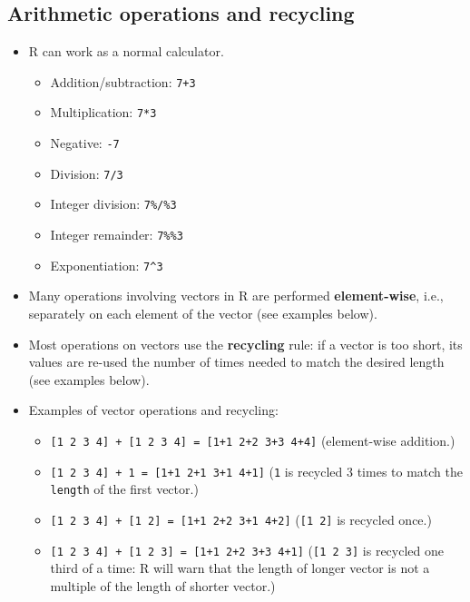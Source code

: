 \documentclass[
]{book}
\providecommand{\tightlist}{%
  \setlength{\itemsep}{0pt}\setlength{\parskip}{0pt}}
\begin{document}
\hypertarget{arithmetic-operations-and-recycling}{%
\subsection{Arithmetic operations and recycling}\label{arithmetic-operations-and-recycling}}

\begin{itemize}
\tightlist
\item
  R can work as a normal calculator.

  \begin{itemize}
  \tightlist
  \item
    Addition/subtraction: \texttt{7+3}
  \item
    Multiplication: \texttt{7*3}
  \item
    Negative: \texttt{-7}
  \item
    Division: \texttt{7/3}
  \item
    Integer division: \texttt{7\%/\%3}
  \item
    Integer remainder: \texttt{7\%\%3}
  \item
    Exponentiation: \texttt{7\^{}3}
  \end{itemize}
\item
  Many operations involving vectors in R are performed \textbf{element-wise}, i.e., separately on each element of the vector (see examples below).
\item
  Most operations on vectors use the \textbf{recycling} rule: if a vector is too short, its values are re-used the number of times needed to match the desired length (see examples below).
\item
  Examples of vector operations and recycling:

  \begin{itemize}
  \tightlist
  \item
    \texttt{{[}1\ 2\ 3\ 4{]}\ +\ {[}1\ 2\ 3\ 4{]}\ =\ {[}1+1\ 2+2\ 3+3\ 4+4{]}} (element-wise addition.)
  \item
    \texttt{{[}1\ 2\ 3\ 4{]}\ +\ 1\ =\ {[}1+1\ 2+1\ 3+1\ 4+1{]}} (\texttt{1} is recycled 3 times to match the \texttt{length} of the first vector.)
  \item
    \texttt{{[}1\ 2\ 3\ 4{]}\ +\ {[}1\ 2{]}\ =\ {[}1+1\ 2+2\ 3+1\ 4+2{]}} (\texttt{{[}1\ 2{]}} is recycled once.)
  \item
    \texttt{{[}1\ 2\ 3\ 4{]}\ +\ {[}1\ 2\ 3{]}\ =\ {[}1+1\ 2+2\ 3+3\ 4+1{]}} (\texttt{{[}1\ 2\ 3{]}} is recycled one third of a time: R will warn that the length of longer vector is not a multiple of the length of shorter vector.)
  \end{itemize}
\end{itemize}
\end{document}
